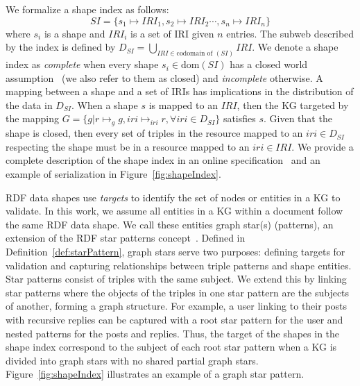 We formalize a shape index as follows:
\begin{equation}\label{eq:shapeIndex}
   SI = \{s_1 \mapsto IRI_1, s_2 \mapsto IRI_2 \cdots, s_n \mapsto IRI_n\}
\end{equation}
where $s_i$ is a shape and $IRI_i$ is a set of IRI given $n$ entries.
The subweb described by the index is defined by $D_{SI} = \bigcup_{IRI \in \text{codomain of }(SI)} IRI$.
We denote a shape index as \emph{complete} when every shape $s_i \in \text{dom}(SI)$ has a closed world assumption~\cite{Gayo2018b, Gayo2018} (we also refer to them as closed) and \emph{incomplete} otherwise.
A mapping between a shape and a set of IRIs has implications in the distribution of the data in $D_{SI}$.
When a shape $s$ is mapped to an $IRI$, then the KG targeted by the mapping $G = \{g | r \mapsto_{g} g, iri \mapsto_{iri} r, \forall iri \in D_{SI}\}$ satisfies $s$.
Given that the shape is closed, then every set of triples in the resource mapped to an $iri \in D_{SI}$ respecting the shape must be in a resource mapped to an $iri \in IRI$.
We provide a complete description of the shape index in an online specification~ and an example of serialization in Figure~\ref{fig:shapeIndex}.

RDF data shapes use \emph{targets} to identify the set of nodes or entities in a KG to validate.  
In this work, we assume all entities in a KG within a document follow the same RDF data shape.  
We call these entities graph star(s) (patterns), an extension of the RDF star patterns concept~\cite{Karim2020}.  
Defined in Definition~\ref{def:starPattern}, graph stars serve two purposes:
defining targets for validation and capturing relationships between triple patterns and shape entities.  
Star patterns consist of triples with the same subject.
We extend this by linking star patterns where the objects of the triples in one star pattern are the subjects of another, forming a graph structure.
For example, a user linking to their posts with recursive replies can be captured with a root star pattern for the user and nested patterns for the posts and replies.  
Thus, the target of the shapes in the shape index correspond to the subject of each root star pattern when a KG is divided into graph stars with no shared partial graph stars.  
Figure~\ref{fig:shapeIndex} illustrates an example of a graph star pattern.


